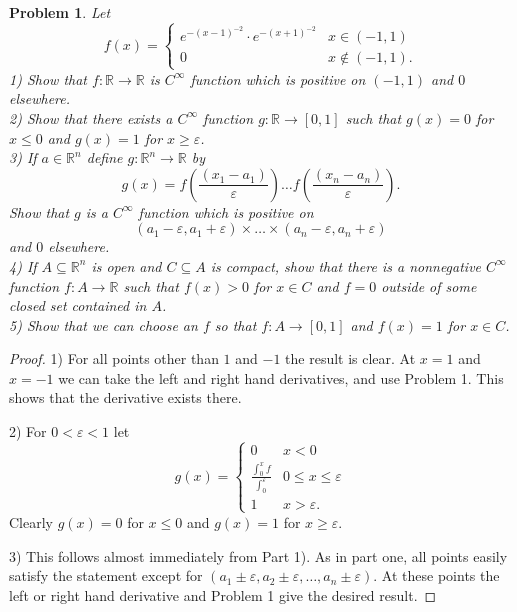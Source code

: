\documentclass{article}
\newtheorem{problem}{Problem}
\begin{document}
\begin{flushleft}
\begin{problem}
Let
\[
f(x) =
\begin{cases}
e^{-(x-1)^{-2}} \cdot e^{-(x+1)^{-2}} & x \in (-1,1)\\
0 & x \notin (-1,1).
\end{cases}
\]
1) Show that $f : \mathbb{R} \rightarrow \mathbb{R}$ is $C^{\infty}$ function which is positive on $(-1,1)$ and $0$ elsewhere.\\
2) Show that there exists a $C^{\infty}$ function $g : \mathbb{R} \rightarrow [0,1]$ such that $g(x) = 0$ for $x \leq 0$ and $g(x) = 1$ for $x \geq \varepsilon$.\\
3) If $a \in \mathbb{R}^n$ define $g : \mathbb{R}^n \rightarrow \mathbb{R}$ by
\[
g(x) = f(\frac{(x_1 - a_1)}{\varepsilon}) \dots f(\frac{(x_n - a_n)}{\varepsilon}).
\]
Show that $g$ is a $C^{\infty}$ function which is positive on
\[
(a_1 - \varepsilon, a_1 + \varepsilon) \times \dots \times (a_n - \varepsilon, a_n + \varepsilon)
\]
and $0$ elsewhere.\\
4) If $A \subseteq \mathbb{R}^n$ is open and $C \subseteq A$ is compact, show that there is a nonnegative $C^{\infty}$ function $f : A \rightarrow \mathbb{R}$ such that $f(x) > 0$ for $x \in C$ and $f=0$ outside of some closed set contained in $A$.\\
5) Show that we can choose an $f$ so that $f : A \rightarrow [0,1]$ and $f(x) = 1$ for $x \in C$.
\end{problem}
\begin{proof}
1) For all points other than $1$ and $-1$ the result is clear. At $x = 1$ and $x = -1$ we can take the left and right hand derivatives, and use Problem 1. This shows that the derivative exists there.\newline

2) For $0 < \varepsilon < 1$ let
\[
g(x) =
\begin{cases}
0 & x < 0\\
\frac{\int_0^x f}{\int_0^{\varepsilon}} & 0 \leq  x \leq \varepsilon\\
1 & x > \varepsilon.
\end{cases}
\]
Clearly $g(x) = 0$ for $x \leq 0$ and $g(x) = 1$ for $x \geq \varepsilon$.\newline

3) This follows almost immediately from Part 1). As in part one, all points easily satisfy the statement except for $(a_1 \pm \varepsilon, a_2 \pm \varepsilon, \dots , a_n \pm \varepsilon)$. At these points the left or right hand derivative and Problem 1 give the desired result.\newline


\end{proof}
\end{flushleft}
\end{document}
